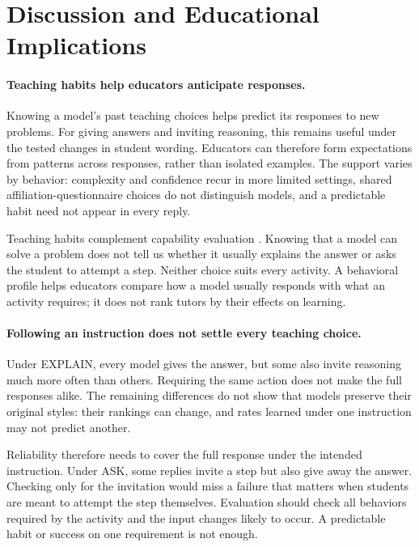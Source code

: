 \section{Discussion and Educational Implications}
\label{sec:discussion}

\paragraph{Teaching habits help educators anticipate responses.}
Knowing a model's past teaching choices helps predict its responses to new
problems. For giving answers and inviting reasoning, this remains useful under
the tested changes in student wording. Educators can therefore form expectations
from patterns across responses, rather than isolated examples. The support
varies by behavior: complexity and confidence recur in more limited settings,
shared affiliation-questionnaire choices do not distinguish models, and a
predictable habit need not appear in every reply.

Teaching habits complement capability evaluation
\citep{maurya2025mrbench,macina2025mathtutorbench}. Knowing that a model can solve
a problem does not tell us whether it usually explains the answer or asks the
student to attempt a step. Neither choice suits every activity. A behavioral
profile helps educators compare how a model usually responds with what an
activity requires; it does not rank tutors by their effects on learning.

\paragraph{Following an instruction does not settle every teaching choice.}
Under EXPLAIN, every model gives the answer, but some also invite reasoning much
more often than others. Requiring the same action does not make the full responses alike. The
remaining differences do not show that models preserve their original styles: their rankings can
change, and rates learned under one instruction may not predict another.

Reliability therefore needs to cover the full response under the intended
instruction. Under ASK, some replies invite a step but also give away the
answer. Checking only for the invitation would miss a failure that matters
when students are meant to attempt the step themselves. Evaluation should
check all behaviors required by the activity and the input changes likely to
occur. A predictable habit or success on one requirement is not enough.

